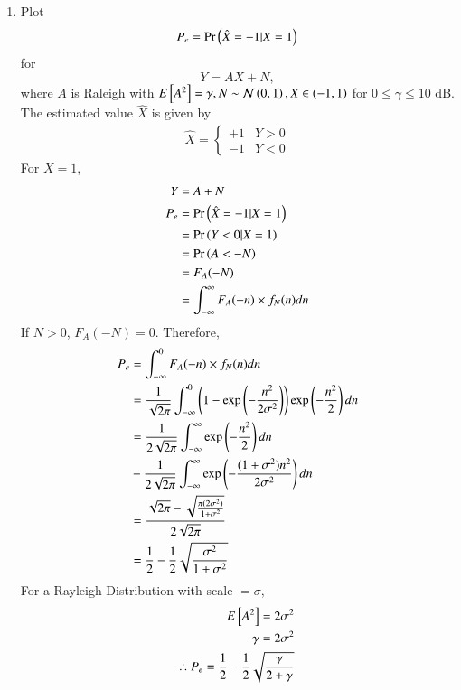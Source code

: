 \begin{enumerate}[label=\thesection.\arabic*.,ref=\thesection.\theenumi]
\item
\label{ch4_sim}
Plot 
\begin{equation}
P_e = \Pr\left(\hat{X} = -1|X=1\right)
\end{equation}
%
for 
\begin{equation}
Y = AX+N,
\end{equation}
where $A$ is Raleigh with $E{}\left[A^2\right] = \gamma, N \sim \mathcal{N}\left(0,1\right), X \in \left(-1,1\right)$ for $0 \le \gamma \le 10$ dB.
\\
\solution The estimated value $\hat{X}$ is given by
\begin{align}
\hat{X} = 
\begin{cases}
+1 & Y>0\\
-1 & Y<0
\end{cases}
\end{align}
For $X = 1$, 
\begin{align}
Y &= A + N\\
P_e &= \Pr\left(\hat{X} = -1|X=1\right) \\
&= \Pr\left(Y<0 |X=1\right)\\
&= \Pr\left(A<-N\right)\\
&= F_A(-N)\\
&= \int_{-\infty}^{\infty} F_A(-n) \times f_N(n) dn
\end{align}
If $N>0$, $F_A(-N) = 0$. Therefore,
\begin{align}
P_e &= \int_{-\infty}^{0} F_A(-n) \times f_N(n) dn\\
&= \frac{1}{\sqrt{2\pi}}\int_{-\infty}^{0} \left(1-\exp \left( -\frac{n^2}{2\sigma^2} \right) \right)\exp \left( -\frac{n^2}{2} \right) dn\\
&= \frac{1}{2\sqrt{2\pi}} \int_{-\infty}^{\infty} \exp \left( -\frac{n^2}{2} \right)dn \nonumber \\
&- \frac{1}{2\sqrt{2\pi}} \int_{-\infty}^{\infty} \exp \left( -\frac{(1+ \sigma^2)n^2}{2 \sigma^2} \right) dn\\
&= \frac{\sqrt{2\pi} - \sqrt{\frac{\pi(2\sigma^2)}{1+\sigma^2}}}{2\sqrt{2\pi}}\\
&= \frac{1}{2} - \frac{1}{2}\sqrt{\frac{\sigma^2}{1+\sigma^2}}
\end{align}
For a Rayleigh Distribution with scale $= \sigma$,
\begin{align}
E\sbrak{A^2} = 2\sigma^2\\
\gamma = 2\sigma^2\\
\therefore P_e = \frac{1}{2} - \frac{1}{2}\sqrt{\frac{\gamma}{2+\gamma}}

\end{align}
\end{enumerate}
